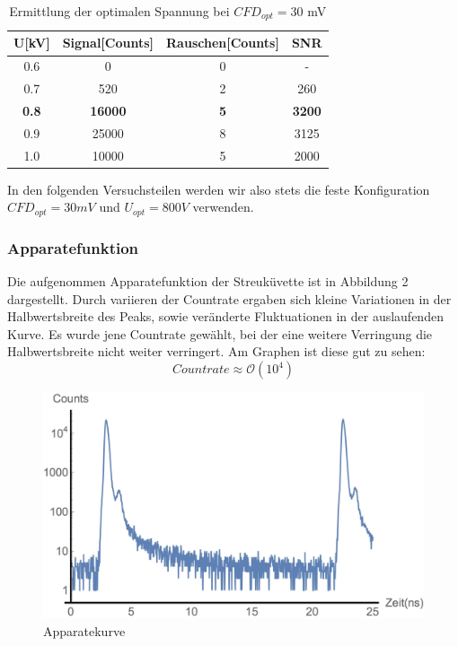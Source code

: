 \documentclass{article}
\begin{document}
\begin{table}[h]
  \centering
  \begin{tabular}{c|c|c|c}
    U[kV] & Signal[Counts] & Rauschen[Counts] & SNR \\
    \hline
    0.6   &     0          & 0                & -\\
    0.7   &    520         & 2                & 260\\
    \textbf{0.8}   &  \textbf{16000}         & \textbf{5}                & \textbf{3200}\\
    0.9   &     25000      & 8                & 3125\\
    1.0   &     10000      & 5                & 2000\\
  \end{tabular}
  \caption{Ermittlung der optimalen Spannung bei $CFD_{opt}=30$ mV}
\end{table}

In den folgenden Versuchsteilen werden wir also stets die feste Konfiguration $CFD_{opt}=30mV$ und $ U_{opt}=800V$ verwenden.

\subsubsection{Apparatefunktion}
Die aufgenommen Apparatefunktion der Streuküvette ist in Abbildung 2 dargestellt. Durch variieren der Countrate ergaben sich
kleine Variationen in der Halbwertsbreite des Peaks, sowie veränderte Fluktuationen in der auslaufenden Kurve. Es wurde jene Countrate
gewählt, bei der eine weitere Verringung die Halbwertsbreite nicht weiter verringert. Am Graphen ist diese gut zu sehen:
$$Countrate \approx \mathcal{O}(10^4)$$

\begin{figure}[h]
  \centering
  \includegraphics[width=\textwidth]{Bilder/apparatekurve.jpg}
  \caption{Apparatekurve}
\end{figure}
\end{document}
